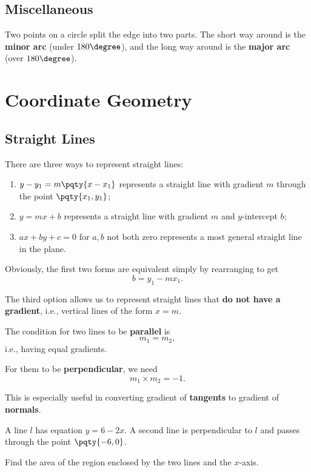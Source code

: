 \documentclass{article}
\begin{document}
\subsection{Miscellaneous}

Two points on a circle split the edge into two parts. The short way around is the \textbf{minor arc} (under \(180 \degree\)), and the long way around is the \textbf{major arc} (over \(180 \degree\)).

\section{Coordinate Geometry}

\subsection{Straight Lines}

There are three ways to represent straight lines:
\begin{enumerate}
    \item \(y - y_1 = m \pqty{x - x_1}\) represents a straight line with gradient \(m\) through the point \(\pqty{x_1, y_1}\);
    \item \(y = mx + b\) represents a straight line with gradient \(m\) and \(y\)-intercept \(b\);
    \item \(ax + by + c = 0\) for \(a, b\) not both zero represents a most general straight line in the plane.
\end{enumerate}

Obviously, the first two forms are equivalent simply by rearranging to get
\[
    b = y_1 - m x_1.
\]

The third option allows us to represent straight lines that \textbf{do not have a gradient}, i.e., vertical lines of the form \(x = m\).

The condition for two lines to be \textbf{parallel} is
\[
    m_1 = m_2,
\]
i.e., having equal gradients.

For them to be \textbf{perpendicular}, we need
\[
    m_1 \times m_2 = -1.
\]

This is especially useful in converting gradient of \textbf{tangents} to gradient of \textbf{normals}.

\begin{example}[TMUA 2017 P1 Q3]
    A line \(l\) has equation \(y = 6 - 2x\). A second line is perpendicular to \(l\) and passes through the point \(\pqty{-6, 0}\).

    Find the area of the region enclosed by the two lines and the \(x\)-axis.
\end{example}
\end{document}
